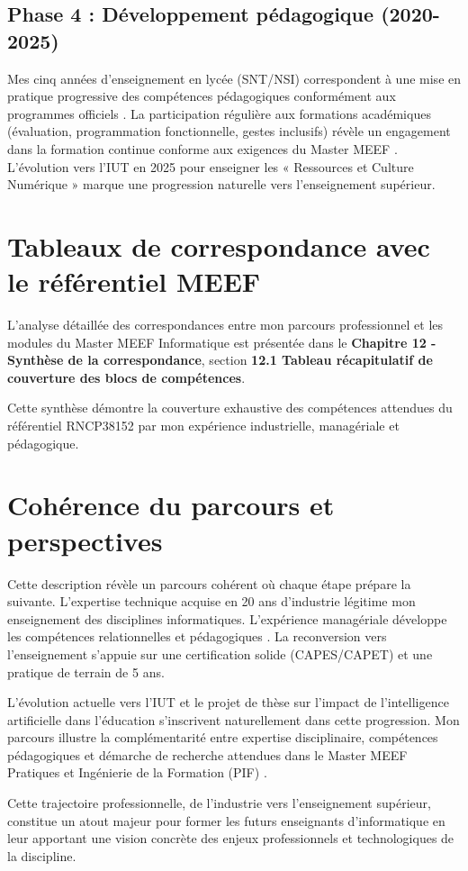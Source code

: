 \subsection{Phase 4 : Développement pédagogique (2020-2025)}

Mes cinq années d'enseignement en lycée (SNT/NSI) correspondent à une mise en pratique progressive des compétences pédagogiques conformément aux programmes officiels \parencite{eduscol_nsi,baccalaureat_nsi}. La participation régulière aux formations académiques (évaluation, programmation fonctionnelle, gestes inclusifs) révèle un engagement dans la formation continue conforme aux exigences du Master MEEF \parencite{referentiel_meef}. L'évolution vers l'IUT en 2025 pour enseigner les « Ressources et Culture Numérique » \parencite{but_informatique} marque une progression naturelle vers l'enseignement supérieur.

\section{Tableaux de correspondance avec le référentiel MEEF}

L'analyse détaillée des correspondances entre mon parcours professionnel et les modules du Master MEEF Informatique est présentée dans le \textbf{Chapitre 12 - Synthèse de la correspondance}, section \textbf{12.1 Tableau récapitulatif de couverture des blocs de compétences}.

Cette synthèse démontre la couverture exhaustive des compétences attendues du référentiel RNCP38152 par mon expérience industrielle, managériale et pédagogique.

\section{Cohérence du parcours et perspectives}

Cette description révèle un parcours cohérent où chaque étape prépare la suivante. L'expertise technique acquise en 20 ans d'industrie légitime mon enseignement des disciplines informatiques. L'expérience managériale développe les compétences relationnelles et pédagogiques \parencite{competences_transversales}. La reconversion vers l'enseignement s'appuie sur une certification solide (CAPES/CAPET) et une pratique de terrain de 5 ans.

L'évolution actuelle vers l'IUT et le projet de thèse sur l'impact de l'intelligence artificielle dans l'éducation \parencite{intelligence_artificielle_education} s'inscrivent naturellement dans cette progression. Mon parcours illustre la complémentarité entre expertise disciplinaire, compétences pédagogiques et démarche de recherche attendues dans le Master MEEF Pratiques et Ingénierie de la Formation (PIF) \parencite{rncp38152,referentiel_meef}.

Cette trajectoire professionnelle, de l'industrie vers l'enseignement supérieur, constitue un atout majeur pour former les futurs enseignants d'informatique en leur apportant une vision concrète des enjeux professionnels et technologiques de la discipline.